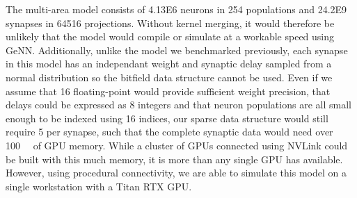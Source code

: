\documentclass[9pt,a4paper]{amsart}
\begin{document}
The multi-area model consists of \num{4.13E6} neurons in \num{254} populations and \num{24.2E9} synapses in \num{64516} projections.
Without kernel merging, it would therefore be unlikely that the model would compile or simulate at a workable speed using GeNN.
Additionally, unlike the model we benchmarked previously, each synapse in this model has an independant weight and synaptic delay sampled from a normal distribution so the bitfield data structure cannot be used.
Even if we assume that \SI{16}{\bit} floating-point would provide sufficient weight precision, that delays could be expressed as \SI{8}{\bit} integers and that neuron populations are all small enough to be indexed using \SI{16}{\bit} indices, our sparse data structure would still require \SI{5}{\byte} per synapse, such that the complete synaptic data would need over \SI{100}{\giga\byte} of GPU memory.
While a cluster of GPUs connected using NVLink could be built with this much memory, it is more than any single GPU has available.
However, using procedural connectivity, we are able to simulate this model on a single workstation with a Titan RTX GPU.
\end{document}
